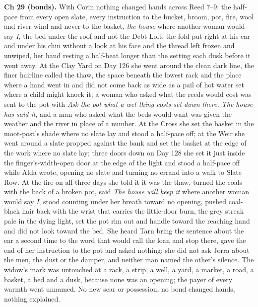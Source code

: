 \documentclass{design/chronicle}
\begin{document}
{\textbf{Ch 29 (bonds).} With Corin nothing changed hands across Reed 7–9: the half-pace from every open slate, every instruction to the bucket, broom, pot, fire, wool and river wind and never to the basket, \emph{the house} where another woman would say \emph{I}, the bed under the roof and not the Debt Loft, the fold put right at his ear and under his chin without a look at his face and the thread left frozen and unwiped, her hand resting a half-beat longer than the setting each dusk before it went away. At the Clay Yard on Day 126 she went around the clean dark line, the finer hairline called the thaw, the space beneath the lowest rack and the place where a hand went in and did not come back as wide as a pail of hot water set where a child might knock it; a woman who asked what the reeds would cost was sent to the pot with \emph{Ask the pot what a wet thing costs set down there. The house has said it}, and a man who asked what the beds would want was given the weather and the river in place of a number. At the Cross she set the basket in the moot-post’s shade where no slate lay and stood a half-pace off; at the Weir she went around a slate propped against the bank and set the basket at the edge of the work where no slate lay; three doors down on Day 128 she set it just inside the finger’s-width-open door at the edge of the light and stood a half-pace off while Alda wrote, opening no slate and turning no errand into a walk to Slate Row. At the fire on all three days she told it it was the thaw, turned the coals with the back of a broken pot, said \emph{The house will keep it} where another woman would say \emph{I}, stood counting under her breath toward no opening, pushed coal-black hair back with the wrist that carries the little-door burn, the grey streak pale in the dying light, set the pot rim out and handle toward the reaching hand and did not look toward the bed. She heard Tarn bring the sentence about the ear a second time to the word that would call the loan and stop there, gave the end of her instruction to the pot and asked nothing; she did not ask Jorra about the men, the dust or the damper, and neither man named the other’s silence. The widow’s mark was untouched at a rack, a strip, a well, a yard, a market, a road, a basket, a bed and a dusk, because none was an opening; the payer of every warmth went unnamed. No new scar or possession, no bond changed hands, nothing explained.

}
\end{document}
